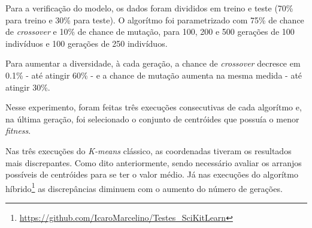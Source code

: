 


Para a verificação do modelo, os dados foram divididos em treino e teste (70\% para treino e 30\% para teste). O  algorítmo foi parametrizado com 75\% de chance de {\it crossover} e 10\% de chance de mutação, para 100, 200 e 500 gerações de 100 indivíduos e 100 gerações de 250 
indivíduos. 

Para aumentar a diversidade, à cada geração, a chance de {\it crossover} decresce em 
0.1\% - até atingir 60\% - e a chance de mutação aumenta na mesma medida - até atingir 
30\%. 

Nesse experimento, foram feitas três execuções consecutivas de cada algorítmo e, na última geração, foi selecionado o conjunto de centróides que possuía o menor {\it fitness}.

Nas três execuções do {\it K-means} clássico, as coordenadas tiveram os resultados mais discrepantes. Como dito anteriormente, sendo necessário avaliar os arranjos possíveis de centróides para se ter o valor médio. Já nas execuções do algorítmo híbrido\footnote[1]{\url{https://github.com/IcaroMarcelino/Testes_SciKitLearn}} as discrepâncias diminuem com o aumento do número de gerações. 

